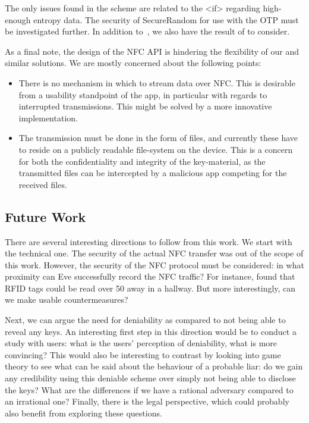 The only issues found in the scheme are related to the <if> regarding 
high-enough entropy data.
The security of SecureRandom for use with the \ac{OTP} must be investigated 
further.
In addition to~\cite{JavaRandomness,AndroidLowEntropyMyth}, we also have the 
result of \citet{UniversalityOTP} to consider.

As a final note, the design of the \ac{NFC} API is hindering the flexibility of 
our and similar solutions.
We are mostly concerned about the following points:
\begin{itemize}
  \item There is no mechanism in which to stream data over \ac{NFC}\@.
    This is desirable from a usability standpoint of the app, in particular 
    with regards to interrupted transmissions.
    This might be solved by a more innovative implementation.
  \item The transmission must be done in the form of files, and currently these 
    have to reside on a publicly readable file-system on the device.
    This is a concern for both the confidentiality and integrity of the 
    key-material, as the transmitted files can be intercepted by a malicious 
    app competing for the received files.
\end{itemize}

\subsection{Future Work}

There are several interesting directions to follow from this work.
We start with the technical one.
The security of the actual \ac{NFC} transfer was out of the scope of this work.
However, the security of the \ac{NFC} protocol must be considered: in what 
proximity can Eve successfully record the \ac{NFC} traffic?
For instance, \citet{RFIDProximity} found that RFID tags could be read over 
\unit{50}{\metre} away in a hallway.
But more interestingly, can we make usable countermeasures?

Next, we can argue the need for deniability as compared to not being able to 
reveal any keys.
An interesting first step in this direction would be to conduct a study with 
users: what is the users' perception of deniability, what is more convincing?
This would also be interesting to contrast by looking into game theory to see 
what can be said about the behaviour of a probable liar: do we gain any 
credibility using this deniable scheme over simply not being able to disclose 
the keys?
What are the differences if we have a rational adversary compared to an 
irrational one?
Finally, there is the legal perspective, which could probably also benefit from 
exploring these questions.

